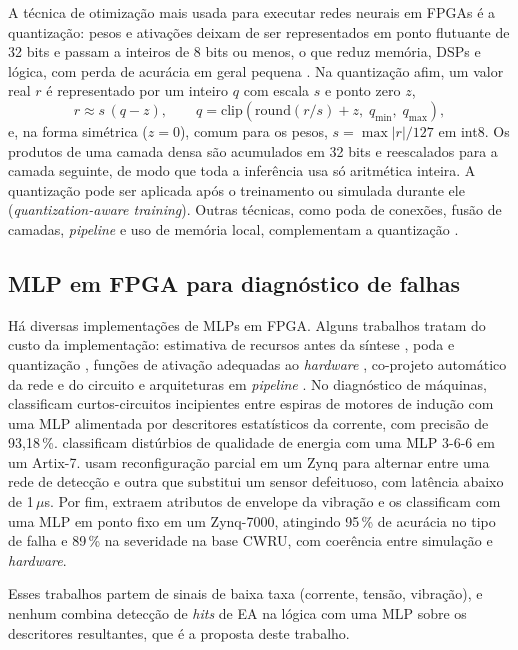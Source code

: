 A técnica de otimização mais usada para executar redes neurais em FPGAs é a quantização: pesos e ativações deixam de ser representados em ponto flutuante de 32 bits e passam a inteiros de 8 bits ou menos, o que reduz memória, DSPs e lógica, com perda de acurácia em geral pequena \cite{jacob2018,nagel2021}. Na quantização afim, um valor real \(r\) é representado por um inteiro \(q\) com escala \(s\) e ponto zero \(z\),
\begin{equation}
	r \approx s\,(q - z), \qquad q = \mathrm{clip}\!\left(\mathrm{round}(r/s) + z,\; q_{\min},\; q_{\max}\right),
	\label{eq:quantizacao}
\end{equation}
e, na forma simétrica (\(z=0\)), comum para os pesos, \(s = \max|r|/127\) em int8. Os produtos de uma camada densa são acumulados em 32 bits e reescalados para a camada seguinte, de modo que toda a inferência usa só aritmética inteira. A quantização pode ser aplicada após o treinamento ou simulada durante ele (\textit{quantization-aware training}). Outras técnicas, como poda de conexões, fusão de camadas, \textit{pipeline} e uso de memória local, complementam a quantização \cite{Shawahna2019,mouri2025optimizing}.

\subsection{MLP em FPGA para diagnóstico de falhas}
\label{subsection:MLP}

Há diversas implementações de MLPs em FPGA. Alguns trabalhos tratam do custo da implementação: estimativa de recursos antes da síntese \cite{kokkinis2025fast}, poda e quantização \cite{ron2022experimental}, funções de ativação adequadas ao \textit{hardware} \cite{si2020neural}, co-projeto automático da rede e do circuito \cite{colangelo2020automl} e arquiteturas em \textit{pipeline} \cite{bahoura2011fpga}. No diagnóstico de máquinas,  classificam curtos-circuitos incipientes entre espiras de motores de indução com uma MLP alimentada por descritores estatísticos da corrente, com precisão de 93,18\,\%.  classificam distúrbios de qualidade de energia com uma MLP 3-6-6 em um Artix-7.  usam reconfiguração parcial em um Zynq para alternar entre uma rede de detecção e outra que substitui um sensor defeituoso, com latência abaixo de 1\,\(\mu\)s. Por fim,  extraem atributos de envelope da vibração e os classificam com uma MLP em ponto fixo em um Zynq-7000, atingindo 95\,\% de acurácia no tipo de falha e 89\,\% na severidade na base CWRU, com coerência entre simulação e \textit{hardware}.

Esses trabalhos partem de sinais de baixa taxa (corrente, tensão, vibração), e nenhum combina detecção de \textit{hits} de EA na lógica com uma MLP sobre os descritores resultantes, que é a proposta deste trabalho.
